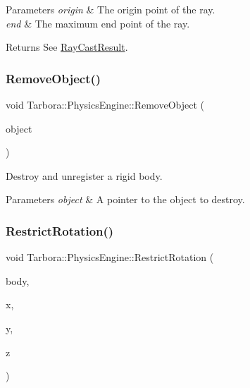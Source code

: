 \begin{DoxyParams}{Parameters}
{\em origin} & The origin point of the ray. \\
\hline
{\em end} & The maximum end point of the ray. \\
\hline
\end{DoxyParams}
\begin{DoxyReturn}{Returns}
See \hyperlink{structTarbora_1_1RayCastResult}{Ray\+Cast\+Result}. 
\end{DoxyReturn}
\mbox{\label{classTarbora_1_1PhysicsEngine_a4debfab1c812e22ccd4f65b0b7e9cea7}} 
\subsubsection{\texorpdfstring{Remove\+Object()}{RemoveObject()}}
{\footnotesize\ttfamily void Tarbora\+::\+Physics\+Engine\+::\+Remove\+Object (\begin{DoxyParamCaption}\item[{bt\+Collision\+Object $\ast$}]{object }\end{DoxyParamCaption})\hspace{0.3cm}{\ttfamily [static]}}



Destroy and unregister a rigid body. 


\begin{DoxyParams}{Parameters}
{\em object} & A pointer to the object to destroy. \\
\hline
\end{DoxyParams}
\mbox{\label{classTarbora_1_1PhysicsEngine_a57ee013c92f3721beb4efbc2405522dd}} 
\subsubsection{\texorpdfstring{Restrict\+Rotation()}{RestrictRotation()}}
{\footnotesize\ttfamily void Tarbora\+::\+Physics\+Engine\+::\+Restrict\+Rotation (\begin{DoxyParamCaption}\item[{bt\+Rigid\+Body $\ast$}]{body,  }\item[{float}]{x,  }\item[{float}]{y,  }\item[{float}]{z }\end{DoxyParamCaption})\hspace{0.3cm}{\ttfamily [static]}}



